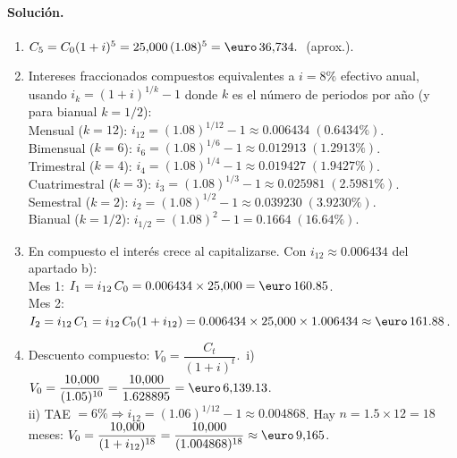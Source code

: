 \documentclass[12pt,a4paper]{article}
\newenvironment{solucion}{\paragraph{Solución.}}{}
\begin{document}
\begin{solucion}
\begin{enumerate}[label=\alph*)]
  \item $C_5=C_0(1+i)^5=25{,}000\,(1.08)^5=\text{\euro}\,36{,}734.\,\!\,\,$ (aprox.).
  \item Intereses fraccionados compuestos equivalentes a $i=8\%$ efectivo anual, usando $i_k=(1+i)^{1/k}-1$ donde $k$ es el número de periodos por año (y para bianual $k=1/2$):\\
        Mensual ($k=12$): $i_{12}=(1.08)^{1/12}-1\approx0.006434\;(0.6434\%)$.\\
        Bimensual ($k=6$): $i_{6}=(1.08)^{1/6}-1\approx0.012913\;(1.2913\%)$.\\
        Trimestral ($k=4$): $i_{4}=(1.08)^{1/4}-1\approx0.019427\;(1.9427\%)$.\\
        Cuatrimestral ($k=3$): $i_{3}=(1.08)^{1/3}-1\approx0.025981\;(2.5981\%)$.\\
        Semestral ($k=2$): $i_{2}=(1.08)^{1/2}-1\approx0.039230\;(3.9230\%)$.\\
        Bianual ($k=1/2$): $i_{1/2}=(1.08)^{2}-1=0.1664\;(16.64\%)$.
  \item En compuesto el interés crece al capitalizarse. Con $i_{12}\approx0.006434$ del apartado b):\\
        Mes 1: $I_1=i_{12}\,C_0=0.006434\times25{,}000=\text{\euro}\,160.85$.\\
        Mes 2: $I_2=i_{12}\,C_1=i_{12}\,C_0(1+i_{12})=0.006434\times25{,}000\times1.006434\approx\text{\euro}\,161.88$.
  \item Descuento compuesto: $V_0=\dfrac{C_t}{(1+i)^t}$.\
        i) $V_0=\dfrac{10{,}000}{(1.05)^{10}}=\dfrac{10{,}000}{1.628895}=\text{\euro}\,6{,}139.13$.\\
        ii) TAE $=6\% \Rightarrow i_{12}=(1.06)^{1/12}-1\approx0.004868$. Hay $n=1.5\times12=18$ meses: $V_0=\dfrac{10{,}000}{(1+i_{12})^{18}}=\dfrac{10{,}000}{(1.004868)^{18}}\approx\text{\euro}\,9{,}165$.
\end{enumerate}
\end{solucion}
\end{document}

